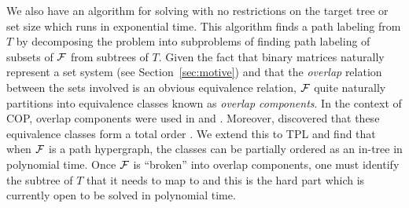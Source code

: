 We also have an algorithm for solving {\CFTPL} with no restrictions on
the target tree or set size which runs in exponential time.  This
algorithm finds a path labeling from $T$ by decomposing the problem
into subproblems of finding path labeling of subsets of ${\cal F}$ from
subtrees of $T$. Given the fact that binary matrices naturally
represent a set system (see Section~\ref{sec:motive}) and that the
{\em overlap}
relation between the sets involved is an obvious equivalence relation,
${\cal F}$ quite naturally partitions into equivalence classes known as
{\em overlap components}. In the context of COP, overlap components were used in
\cite{wlh02} and \cite{kklv10}. Moreover, \cite{nsnrs09} discovered
that these equivalence classes form a total order . We extend this to TPL
and find that when ${\cal F}$ is a path hypergraph,
the classes can be partially ordered as an in-tree in polynomial
time. Once ${\cal F}$ is ``broken'' into overlap components, one must
identify the subtree of $T$ that it needs to map to and this is the
hard part which is currently open to be solved in polynomial time.



\theendnotes